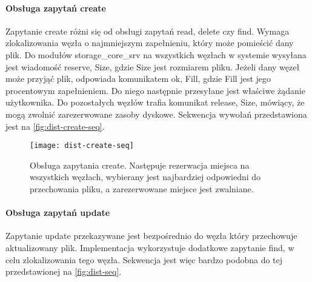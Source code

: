 \paragraph{Obsługa zapytań create}
Zapytanie create różni się od obsługi zapytań read, delete czy find. Wymaga zlokalizowania węzła o najmniejszym zapełnieniu, który może pomieścić dany plik. Do modułów storage\_core\_srv na wszystkich węzłach w systemie wysyłana jest wiadomość {reserve, Size}, gdzie Size jest rozmiarem pliku. Jeżeli dany węzeł może przyjąć plik, odpowiada komunikatem {ok, Fill}, gdzie Fill jest jego procentowym zapełnieniem. Do niego następnie przesyłane jest właściwe żądanie użytkownika. Do pozostałych węzłów trafia komunikat {release, Size}, mówiący, że mogą zwolnić zarezerwowane zasoby dyskowe. Sekwencja wywołań przedstawiona jest na \autoref{fig:dist-create-seq}.

\begin{figure}[!htbp]
	\centering
	\texttt{[image: dist-create-seq]}
	\caption[Zapytanie \textit{create} w module komunikacyjnym.]{Obsługa zapytania create. Następuje rezerwacja miejsca na wszystkich węzłach, wybierany jest najbardziej odpowiedni do przechowania pliku, a zarezerwowane miejsce jest zwalniane.}
	\label{fig:dist-create-seq}
\end{figure}


\paragraph{Obsługa zapytań update}
Zapytanie update przekazywane jest bezpośrednio do węzła który przechowuje aktualizowany plik. Implementacja wykorzystuje dodatkowe zapytanie find, w celu zlokalizowania tego węzła. Sekwencja jest więc bardzo podobna do tej przedstawionej na \autoref{fig:dist-seq}.
